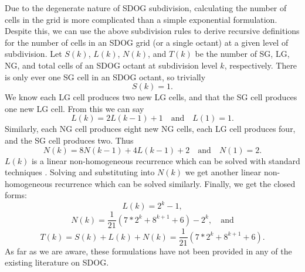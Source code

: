 Due to the degenerate nature of SDOG subdivision, calculating the number of cells in the grid is more complicated than a simple exponential formulation. Despite this, we can use the above subdivision rules to derive recursive definitions for the number of cells in an SDOG grid (or a single octant) at a given level of subdivision. Let $S(k)$, $L(k)$, $N(k)$, and $T(k)$ be the number of SG, LG, NG, and total cells of an SDOG octant at subdivision level $k$, respectively. There is only ever one SG cell in an SDOG octant, so trivially
%
\begin{equation}
S(k) = 1.
\label{eq:sg-num}
\end{equation}
%
We know each LG cell produces two new LG cells, and that the SG cell produces one new LG cell. From this we can say
\begin{equation*}
L(k) = 2L(k-1) + 1 \quad\text{and}\quad L(1) = 1.
\label{eq:lg-recursive}
\end{equation*}
%
Similarly, each NG cell produces eight new NG cells, each LG cell produces four, and the SG cell produces two. Thus
\begin{equation*}
N(k) = 8N(k-1) + 4L(k-1) + 2 \quad\text{and}\quad N(1) = 2.
\label{eq:ng-recursive}
\end{equation*}
%
$L(k)$ is a linear non-homogeneous recurrence which can be solved with standard techniques \cite{bellman1963differential}. Solving and substituting into $N(k)$ we get another linear non-homogeneous recurrence which can be solved similarly. Finally, we get the closed forms:
%
\begin{equation}
L(k) = 2^{k} - 1,
\label{eq:lg-closed}
\end{equation}
%
\begin{equation}
N(k) = \frac{1}{21} \left( 7*2^{k} + 8^{k+1} + 6 \right) - 2^{k}, \quad\text{and}
\label{eq:ng-closed}
\end{equation}
%
\begin{equation}
T(k) = S(k) + L(k) + N(k) = \frac{1}{21} \left( 7*2^{k} + 8^{k+1} + 6 \right).
\label{eq:t-closed}
\end{equation}
%
As far as we are aware, these formulations have not been provided in any of the existing literature on SDOG.


